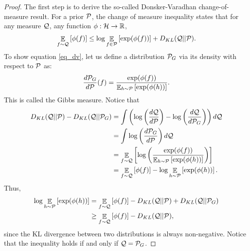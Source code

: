 \begin{proof}
The first step is to derive the so-called Donsker-Varadhan change-of-measure result.
For a prior $\mathcal{P}$, the change of measure inequality states that for any measure $\mathcal{Q}$, any function $\phi: \mathcal{H} \rightarrow \mathbb{R}$,
\begin{align}
    \mathop{\mathbb{E}}_{f\sim\mathcal{Q}}\left[ \phi(f) \right] \le \log \mathop{\mathbb{E}}_{f \in \mathcal{P}}\left[ \exp(\phi(f)) \right] + D_{KL}(\mathcal{Q} || \mathcal{P}). \label{eq_dv}
\end{align}
To show equation \eqref{eq_dv}, let us define a distribution $\mathcal{P}_G$ via its density with respect to $\mathcal{P}$ as:
\[ \frac {d\mathcal{P}_{G}} {d\mathcal{P}} (f) = \frac {\exp(\phi(f))} {\mathop{\mathbb{E}}_{h\sim\mathcal{P}}\left[ \exp(\phi(h)) \right] }. \]
This is called the Gibbs measure.
Notice that
\begin{align*}
    D_{KL}(\mathcal{Q} || \mathcal{P}) - D_{KL}(\mathcal{Q} || \mathcal{P}_G)
    &= \int \left( \log\left(\frac {d \mathcal{Q}} {d \mathcal{P}}\right) - \log\left( \frac {d\mathcal{Q}} {d \mathcal{P}_G} \right) \right) d \mathcal{Q} \\
    &= \int \log\left( \frac {d \mathcal{P}_G} {d \mathcal{P}} \right) d \mathcal{Q} \\
    &= \mathop{\mathbb{E}}_{f\sim\mathcal{Q}}\left[ \log\left( \frac {\exp(\phi(f))} {\mathop{\mathbb{E}}_{h\sim\mathcal{P}}\left[ \exp(\phi(h)) \right]} \right) \right] \\
    &= \mathop{\mathbb{E}}_{f\sim\mathcal{Q}}\left[ \phi(f) \right] - \log \mathop{\mathbb{E}}_{h\sim\mathcal{P}}\left[ \exp(\phi(h)) \right].
\end{align*}
Thus,
\begin{align*}
    \log\mathop{\mathbb{E}}_{h\sim\mathcal{P}}\left[ \exp(\phi(h)) \right]
    &= \mathop{\mathbb{E}}_{f\sim\mathcal{Q}}\left[ \phi(f) \right] - D_{KL}(\mathcal{Q} || \mathcal{P}) + D_{KL}(\mathcal{Q} || \mathcal{P}_G) \\
    &\ge \mathop{\mathbb{E}}_{f\sim\mathcal{Q}}\left[ \phi(f) \right] - D_{KL}(\mathcal{Q} || \mathcal{P}),
\end{align*}
since the KL divergence between two distributions is always non-negative.
Notice that the inequality holds if and only if $\mathcal{Q} = \mathcal{P}_G$.


\end{proof}
